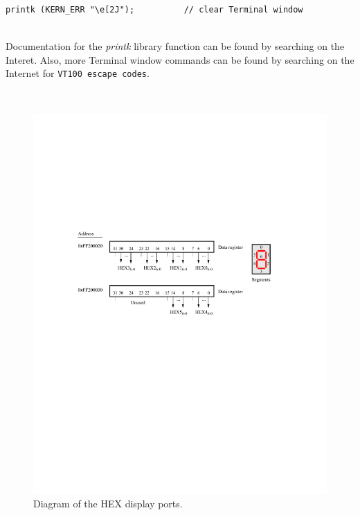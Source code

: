 \documentclass[epsfig,10pt,fullpage]{article}
\begin{document}
\begin{lstlisting}
printk (KERN_ERR "\e[2J");			// clear Terminal window
\end{lstlisting}

~\\
\noindent Documentation for the {\it printk} library function can be found by searching on
the Interet. Also, more Terminal window commands can be found by searching on the Internet for
\texttt{VT100 escape codes}.

~\\
\begin{figure}[H]
   \begin{center}
       \includegraphics{figures/fig_segment_port.pdf}
   \end{center}
   \caption{Diagram of the HEX display ports.}
	\label{fig:hex}
\end{figure}
\end{document}
